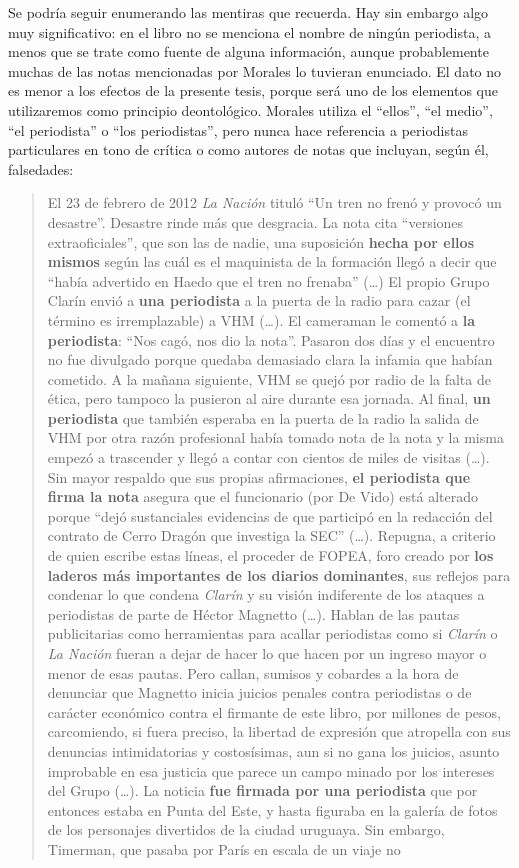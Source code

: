{Se podría seguir enumerando las mentiras que recuerda. Hay sin embargo algo muy significativo: en el libro no se menciona el nombre de ningún periodista, a menos que se trate como fuente de alguna información, aunque probablemente muchas de las notas mencionadas por Morales lo tuvieran enunciado. El dato no es menor a los efectos de la presente tesis, porque será uno de los elementos que utilizaremos como principio deontológico. Morales utiliza el ``ellos'', ``el medio'', ``el periodista'' o ``los periodistas'', pero nunca hace referencia a periodistas particulares en tono de crítica o como autores de notas que incluyan, según él, falsedades:

\begin{quote}
El 23 de febrero de 2012 \emph{La Nación} tituló ``Un tren no frenó y provocó un desastre''. Desastre rinde más que desgracia. La nota cita ``versiones extraoficiales'', que son las de nadie, una suposición \textbf{hecha por ellos mismos} según las cuál es el maquinista de la formación llegó a decir que ``había advertido en Haedo que el tren no frenaba'' (\ldots) El propio Grupo Clarín envió a \textbf{una periodista} a la puerta de la radio para cazar (el término es irremplazable) a VHM (\ldots). El cameraman le comentó a \textbf{la periodista}: ``Nos cagó, nos dio la nota''. Pasaron dos días y el encuentro no fue divulgado porque quedaba demasiado clara la infamia que habían cometido. A la mañana siguiente, VHM se quejó por radio de la falta de ética, pero tampoco la pusieron al aire durante esa jornada. Al final, \textbf{un periodista} que también esperaba en la puerta de la radio la salida de VHM por otra razón profesional había tomado nota de la nota y la misma empezó a trascender y llegó a contar con cientos de miles de visitas (\ldots). Sin mayor respaldo que sus propias afirmaciones, \textbf{el periodista que firma la nota} asegura que el funcionario (por De Vido) está alterado porque ``dejó sustanciales evidencias de que participó en la redacción del contrato de Cerro Dragón que investiga la SEC'' (\ldots). Repugna, a criterio de quien escribe estas líneas, el proceder de FOPEA, foro creado por \textbf{los laderos más importantes de los diarios dominantes}, sus reflejos para condenar lo que condena \emph{Clarín} y su visión indiferente de los ataques a periodistas de parte de Héctor Magnetto (\ldots). Hablan de las pautas publicitarias como herramientas para acallar periodistas como si \emph{Clarín} o \emph{La Nación} fueran a dejar de hacer lo que hacen por un ingreso mayor o menor de esas pautas. Pero callan, sumisos y cobardes a la hora de denunciar que Magnetto inicia juicios penales contra periodistas o de carácter económico contra el firmante de este libro, por millones de pesos, carcomiendo, si fuera preciso, la libertad de expresión que atropella con sus denuncias intimidatorias y costosísimas, aun si no gana los juicios, asunto improbable en esa justicia que parece un campo minado por los intereses del Grupo (\ldots). La noticia \textbf{fue firmada por una periodista} que por entonces estaba en Punta del Este, y hasta figuraba en la galería de fotos de los personajes divertidos de la ciudad uruguaya. Sin embargo, Timerman, que pasaba por París en escala de un viaje no 
\end{quote}}

